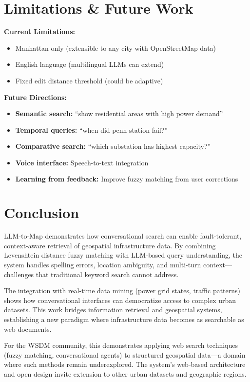 \documentclass[sigconf]{acmart}
\begin{document}
\section{Limitations \& Future Work}

\textbf{Current Limitations:}
\begin{itemize}
    \item Manhattan only (extensible to any city with OpenStreetMap data)
    \item English language (multilingual LLMs can extend)
    \item Fixed edit distance threshold (could be adaptive)
\end{itemize}

\textbf{Future Directions:}
\begin{itemize}
    \item \textbf{Semantic search:} ``show residential areas with high power demand''
    \item \textbf{Temporal queries:} ``when did penn station fail?''
    \item \textbf{Comparative search:} ``which substation has highest capacity?''
    \item \textbf{Voice interface:} Speech-to-text integration
    \item \textbf{Learning from feedback:} Improve fuzzy matching from user corrections
\end{itemize}

\section{Conclusion}

LLM-to-Map demonstrates how conversational search can enable fault-tolerant, context-aware retrieval of geospatial infrastructure data. By combining Levenshtein distance fuzzy matching with LLM-based query understanding, the system handles spelling errors, location ambiguity, and multi-turn context—challenges that traditional keyword search cannot address.

The integration with real-time data mining (power grid states, traffic patterns) shows how conversational interfaces can democratize access to complex urban datasets. This work bridges information retrieval and geospatial systems, establishing a new paradigm where infrastructure data becomes as searchable as web documents.

For the WSDM community, this demonstrates applying web search techniques (fuzzy matching, conversational agents) to structured geospatial data—a domain where such methods remain underexplored. The system's web-based architecture and open design invite extension to other urban datasets and geographic regions.
\end{document}
